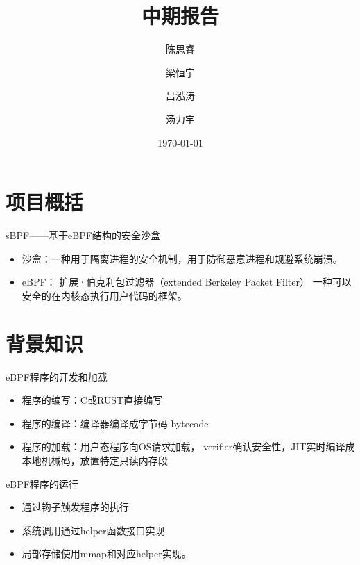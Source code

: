 \documentclass[UTF8,aspectratio=169,fontset=macnew,xcolor=table]{ctexbeamer}
\begin{document}
\title[中期报告]{\huge 中期报告}
\author[中国科学技术大学]{陈思睿 \and 梁恒宇 \and 吕泓涛 \and 汤力宇}
\date[\today]{\today}
\begin{frame}
    \titlepage
\end{frame}

\section{项目概括}
\begin{frame}{sBPF——基于eBPF结构的安全沙盒}

    \begin{itemize}
        \item 沙盒：一种用于隔离进程的安全机制，用于防御恶意进程和规避系统崩溃。

        \item eBPF： 扩展·伯克利包过滤器（extended Berkeley Packet Filter）
        一种可以安全的在内核态执行用户代码的框架。
        
    \end{itemize}
    
\end{frame}

\section{背景知识}

\begin{frame}{eBPF程序的开发和加载}

    \begin{itemize}
        \item 程序的编写：C或RUST直接编写

        \item 程序的编译：编译器编译成字节码 bytecode
        
        \item 程序的加载：用户态程序向OS请求加载，
        verifier确认安全性，JIT实时编译成本地机械码，放置特定只读内存段
    \end{itemize}
    
\end{frame}

\begin{frame}{eBPF程序的运行}

    \begin{itemize}
        \item 通过钩子触发程序的执行

        \item 系统调用通过helper函数接口实现
        
        \item 局部存储使用mmap和对应helper实现。
    \end{itemize}
    
\end{frame}
\end{document}
